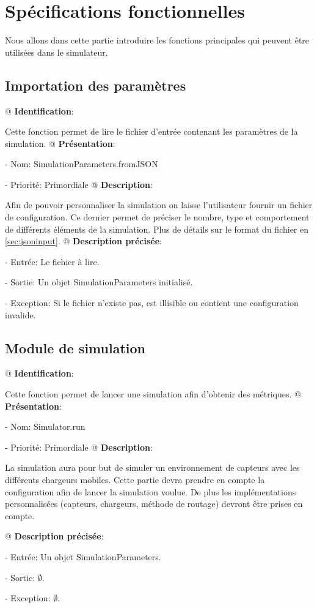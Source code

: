 \documentclass[noposter,final]{polytech/polytech}
\begin{document}
\chapter{Spécifications fonctionnelles}
	Nous allons dans cette partie introduire les fonctions principales qui peuvent être utilisées dans le simulateur.
	
	\section{Importation des paramètres}
		\begin{easylist}[enumerate]
			@ \textbf{Identification}:
			
			Cette fonction permet de lire le fichier d'entrée contenant les paramètres de la simulation.
			@ \textbf{Présentation}:
			
			- Nom: SimulationParameters.fromJSON
			
			- Priorité: Primordiale
			@ \textbf{Description}:
			
			Afin de pouvoir personnaliser la simulation on laisse l'utilisateur fournir un fichier de configuration.
			Ce dernier permet de préciser le nombre, type et comportement de différents éléments de la simulation.
			Plus de détails sur le format du fichier en \autoref{sec:jsoninput}.
			@ \textbf{Description précisée}:
			
			- Entrée: Le fichier à lire.
			
			- Sortie: Un objet SimulationParameters initialisé.
			
			- Exception: Si le fichier n'existe pas, est illisible ou contient une configuration invalide.
		\end{easylist}
		
	\section{Module de simulation}
		\begin{easylist}[enumerate]
			@ \textbf{Identification}:
			
			Cette fonction permet de lancer une simulation afin d'obtenir des métriques.
			@ \textbf{Présentation}:
			
			- Nom: Simulator.run
			
			- Priorité: Primordiale
			@ \textbf{Description}:
			
			La simulation aura pour but de simuler un environnement de capteurs avec les différents chargeurs mobiles.
			Cette partie devra prendre en compte la configuration afin de lancer la simulation voulue.
			De plus les implémentations personnalisées (capteurs, chargeurs, méthode de routage) devront être prises en compte.
			
			@ \textbf{Description précisée}:
			
			- Entrée: Un objet SimulationParameters.
			
			- Sortie: $\emptyset$.
			
			- Exception: $\emptyset$.
		\end{easylist}
\end{document}
